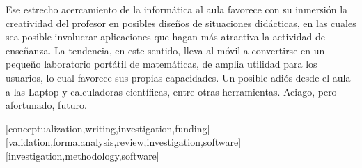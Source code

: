 \documentclass[spanish]{textolivre}
\begin{document}
Ese estrecho acercamiento de la informática al aula favorece con su inmersión la creatividad del profesor en posibles diseños de situaciones didácticas, en las cuales sea posible involucrar aplicaciones que hagan más atractiva la actividad de enseñanza. La tendencia, en este sentido, lleva al móvil a convertirse en un pequeño laboratorio portátil de matemáticas, de amplia utilidad para los usuarios, lo cual favorece sus propias capacidades. Un posible adiós desde el aula a las Laptop y calculadoras científicas, entre otras herramientas. Aciago, pero afortunado, futuro. 




\printbibliography\label{sec-bib}

\begin{contributors}
[conceptualization,writing,investigation,funding]
[validation,formalanalysis,review,investigation,software]
[investigation,methodology,software]
\end{contributors}
\end{document}
